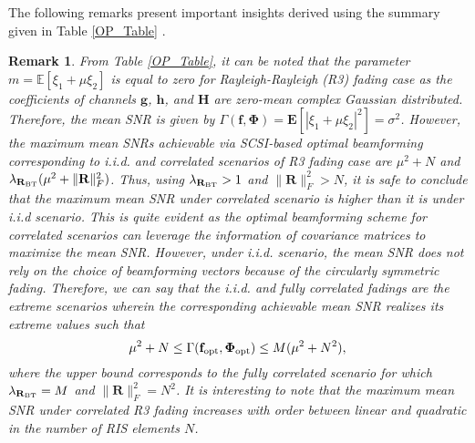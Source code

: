 \documentclass[journal,draftclsnofoot,onecolumn,12pt]{IEEEtran}
\newtheorem{remark}{Remark}
\begin{document}
The following remarks present important insights derived using the  summary given in Table \ref{OP_Table} .
\begin{remark}\label{remark1}
From Table \ref{OP_Table}, it can be noted that the parameter $m=\mathbb{E}[\xi_1+\mu\xi_2]$ is equal to zero for Rayleigh-Rayleigh (R3) fading case as the coefficients of channels  $\mathbf{g}$, $\mathbf{h}$, and $\mathbf{H}$ are zero-mean complex Gaussian distributed. 
Therefore, the mean SNR is given by  
$\Gamma(\mathbf{f},\mathbf{\Phi})=\mathbf{E}[|\xi_1+\mu\xi_2|^2]=\sigma^2$. However, the  maximum mean SNRs achievable via SCSI-based optimal beamforming corresponding to  {\rm i.i.d.} and correlated scenarios of R3 fading case are $\mu^2+N$ and $\lambda_{\mathbf{R}_{\rm BT}}(\mu^2+\|\mathbf{R}\|_F^2)$. 
Thus, using $\lambda_{\mathbf{R}_{\rm BT}}>1$  and $\|\mathbf{R}\|_F^2>N$, it is safe to conclude that the maximum mean SNR under correlated scenario is higher than it is under {\rm i.i.d} scenario.  This is quite evident as the optimal beamforming scheme for correlated scenarios can leverage the information of covariance matrices to maximize the mean SNR.  
However, under {\rm i.i.d.} scenario, the mean SNR does not rely on the choice of beamforming vectors because of the  circularly symmetric fading. Therefore, we can say that the {\rm i.i.d.} and  fully correlated fadings are the extreme scenarios wherein the corresponding achievable mean SNR realizes its extreme values such that
$$\mu^2+N\leq \Gamma(\mathbf{f}_{\rm opt},\mathbf{\Phi}_{\rm opt})\leq M(\mu^2+N^2),$$
where the upper bound corresponds to the fully correlated scenario for which $\lambda_{\mathbf{R}_{\rm BT}}=M$ and $\|\mathbf{R}\|_F^2=N^2$. It is interesting to note  that the maximum mean SNR under correlated R3 fading increases with order  between linear and quadratic in  the number of RIS elements
$N$.  
\end{remark}
\vspace{-0.4cm}
\end{document}

